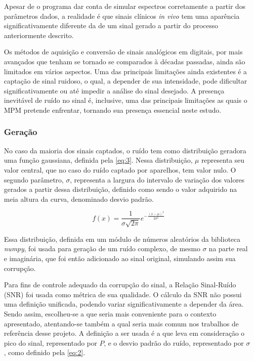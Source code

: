 \documentclass{article}
\begin{document}
Apesar de o programa dar conta de simular espectros corretamente a partir dos parâmetros dados, a realidade é que sinais clínicos \textit{in vivo} tem uma aparência significativamente 
diferente da de um sinal gerado a partir do processo anteriormente descrito. 

Os métodos de aquisição e conversão de sinais analógicos em digitais, por mais avançados que tenham se tornado se comparados à décadas passadas, ainda são limitados em vários aspectos. Uma das principais 
limitações ainda existentes é a captação de sinal ruidoso, o qual, a depender de sua intensidade, pode dificultar significativamente ou até impedir a análise do sinal desejado. A presença 
inevitável de ruído no sinal é, inclusive, uma das principais limitações as quais o MPM pretende enfrentar, tornando sua presença essencial neste estudo. 

\subsubsection{Geração}

No caso da maioria dos sinais captados, o ruído tem como distribuição geradora uma função gaussiana, definida pela \autoref{eq:3}. Nessa distribuição, $\mu$ representa seu valor central, 
que no caso do ruído captado por aparelhos, tem valor nulo. O segundo parâmetro, $\sigma$, representa a largura do intervalo de variação dos valores gerados a partir dessa 
distribuição, definido como sendo o valor adquirido na meia altura da curva, denominado desvio padrão.


\begin{equation} \label{eq:3}
    f(x) = \frac{1}{\sigma \sqrt{2\pi}}e^{-\frac{(x - \mu)^2}{2\sigma ^2}}
\end{equation}

Essa distribuição, definida em um módulo de números aleatórios da biblioteca \textit{numpy}, foi usada para geração de um ruído complexo, de mesmo $\sigma$ na parte real e imaginária, que foi então adicionado ao sinal original, simulando assim sua
corrupção.

Para fins de controle adequado da corrupção do sinal, a Relação Sinal-Ruído (SNR) foi usada como métrica de sua qualidade. O cálculo da SNR não possui uma definição unificada, podendo variar significativamente a depender da área. Sendo assim, 
escolheu-se a que seria mais conveniente para o contexto apresentado, atentando-se também a qual seria mais comum nos trabalhos de referência desse projeto. A definição a ser usada é a que 
leva em consideração o pico do sinal, representado por $P$, e o desvio padrão do ruído, representado por $\sigma$ \cite{}, como definido pela \autoref{eq:2}.  
\end{document}
